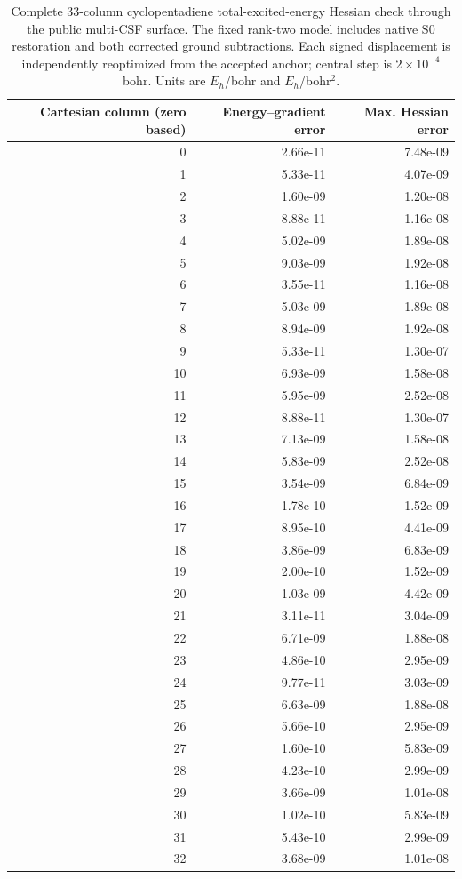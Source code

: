 \begin{longtable}{rrr}
\caption{Complete 33-column cyclopentadiene total-excited-energy Hessian check through the public multi-CSF surface. The fixed rank-two model includes native S0 restoration and both corrected ground subtractions. Each signed displacement is independently reoptimized from the accepted anchor; central step is $2\times10^{-4}$ bohr. Units are $E_h$/bohr and $E_h$/bohr$^2$.}\label{tab:cpdcolumns}\\
\toprule
Cartesian column (zero based) & Energy--gradient error & Max. Hessian error \\
\midrule\endhead
0 & 2.66e-11 & 7.48e-09 \\
1 & 5.33e-11 & 4.07e-09 \\
2 & 1.60e-09 & 1.20e-08 \\
3 & 8.88e-11 & 1.16e-08 \\
4 & 5.02e-09 & 1.89e-08 \\
5 & 9.03e-09 & 1.92e-08 \\
6 & 3.55e-11 & 1.16e-08 \\
7 & 5.03e-09 & 1.89e-08 \\
8 & 8.94e-09 & 1.92e-08 \\
9 & 5.33e-11 & 1.30e-07 \\
10 & 6.93e-09 & 1.58e-08 \\
11 & 5.95e-09 & 2.52e-08 \\
12 & 8.88e-11 & 1.30e-07 \\
13 & 7.13e-09 & 1.58e-08 \\
14 & 5.83e-09 & 2.52e-08 \\
15 & 3.54e-09 & 6.84e-09 \\
16 & 1.78e-10 & 1.52e-09 \\
17 & 8.95e-10 & 4.41e-09 \\
18 & 3.86e-09 & 6.83e-09 \\
19 & 2.00e-10 & 1.52e-09 \\
20 & 1.03e-09 & 4.42e-09 \\
21 & 3.11e-11 & 3.04e-09 \\
22 & 6.71e-09 & 1.88e-08 \\
23 & 4.86e-10 & 2.95e-09 \\
24 & 9.77e-11 & 3.03e-09 \\
25 & 6.63e-09 & 1.88e-08 \\
26 & 5.66e-10 & 2.95e-09 \\
27 & 1.60e-10 & 5.83e-09 \\
28 & 4.23e-10 & 2.99e-09 \\
29 & 3.66e-09 & 1.01e-08 \\
30 & 1.02e-10 & 5.83e-09 \\
31 & 5.43e-10 & 2.99e-09 \\
32 & 3.68e-09 & 1.01e-08 \\
\bottomrule
\end{longtable}
